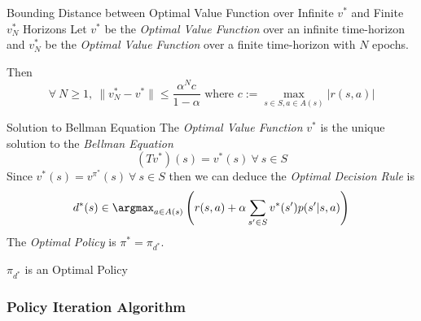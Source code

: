 \documentclass[11pt,a4paper]{article}
\begin{document}
  \begin{theorem}{Bounding Distance between Optimal Value Function over Infinite $v^*$ and Finite $v_N^*$ Horizons}
    Let $v^*$ be the \textit{Optimal Value Function} over an infinite time-horizon and $v^*_N$ be the \textit{Optimal Value Function} over a finite time-horizon with $N$ epochs.
    \par Then
    \[ \forall\ N\geq1,\ \|v_N^*-v^*\|\leq \frac{\alpha^Nc}{1-\alpha}\text{ where }c:=\max_{s\in S,a\in A(s)}|r(s,a)| \]
  \end{theorem}

  \begin{theorem}{Solution to Bellman Equation}
    The \textit{Optimal Value Function} $v^*$ is the unique solution to the \textit{Bellman Equation}
    \[ (Tv^*)(s)=v^*(s)\ \forall\ s\in S \]
    Since $v^*(s)=v^{\pi^*}(s)\ \forall\ s\in S$ then we can deduce the \textit{Optimal Decision Rule} is
    \[ d^*(s)\in\argmax_{a\in A(s)}\left(r(s,a)+\alpha\sum_{s'\in S}v^*(s')p(s'|s,a)\right) \]
    The \textit{Optimal Policy} is $\pi^*=\pi_{d^*}$.
  \end{theorem}

  \begin{remark}{$\pi_{d^*}$ is an Optimal Policy}

  \end{remark}

\subsubsection{Policy Iteration Algorithm}
\end{document}
